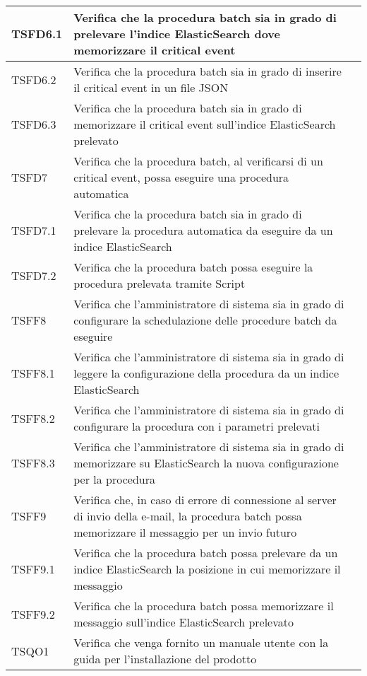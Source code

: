 \begin{center}
\begin{longtable}{ | >{\centering\arraybackslash}m{2.5cm} | >{\raggedright\arraybackslash}m{9cm} | >{\centering\arraybackslash}m{3.5cm} | }
				TSFD6.1 & Verifica che la procedura batch sia in grado di prelevare l'indice ElasticSearch dove memorizzare il critical
							event & \donetext{} \\ \hline
				TSFD6.2 & Verifica che la procedura batch sia in grado di inserire il critical event in un ﬁle JSON & \donetext{} \\ \hline
				TSFD6.3 & Verifica che la procedura batch sia in grado di memorizzare il critical event sull’indice ElasticSearch prelevato & \donetext{} \\ \hline
				TSFD7 & Verifica che la procedura batch, al verificarsi di un critical event, possa eseguire una procedura automatica & \donetext{} \\ \hline
				TSFD7.1 & Verifica che la procedura batch sia in grado di prelevare la procedura automatica da eseguire
							da un indice ElasticSearch & \donetext{} \\ \hline
				TSFD7.2 & Verifica che la procedura batch possa eseguire la procedura prelevata tramite Script \glossaryItem{Bash}
 & \donetext{} \\ \hline
				TSFF8 & Verifica che l'amministratore di sistema sia in grado di configurare la schedulazione delle procedure batch da eseguire & \donetext{} \\ \hline
				TSFF8.1 & Verifica che l'amministratore di sistema sia in grado di leggere la configurazione della procedura
							da un indice ElasticSearch & \donetext{} \\ \hline
				TSFF8.2 & Verifica che l'amministratore di sistema sia in grado di configurare la procedura con i parametri prelevati & \donetext{} \\ \hline
				TSFF8.3 & Verifica che l'amministratore di sistema sia in grado di memorizzare su ElasticSearch la nuova configurazione
							per la procedura & \donetext{} \\ \hline
				TSFF9 & Verifica che, in caso di errore di connessione al server di invio della e-mail, la procedura batch possa memorizzare il messaggio per un invio futuro & \donetext{} \\ \hline
				TSFF9.1 & Verifica che la procedura batch possa prelevare da un indice ElasticSearch la posizione in cui memorizzare il messaggio
 & \donetext{} \\ \hline
				TSFF9.2 & Verifica che la procedura batch possa memorizzare il messaggio sull’indice ElasticSearch prelevato
 & \donetext{} \\ \hline
 				TSQO1 & Verifica che venga fornito un manuale utente con la guida per l'installazione del prodotto & \donetext{} \\ \hline

\end{longtable}
\end{center}
